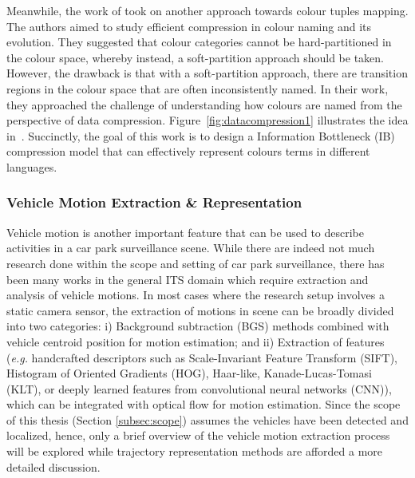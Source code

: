 Meanwhile, the work of \cite{zaslavsky2018efficient} took on another approach towards
colour tuples mapping. The authors aimed to study efficient compression in colour naming and its evolution. They suggested that colour categories cannot be hard-partitioned in the colour space, whereby instead, a soft-partition approach should be taken. However, the drawback is that with a soft-partition approach, there are transition regions in the colour space that are often inconsistently named. In their work, they approached the challenge of understanding how colours are named from the perspective of data compression. Figure~\ref{fig:datacompression1} illustrates the idea in~\cite{zaslavsky2018efficient}. Succinctly, the goal of this work is to design a Information Bottleneck (IB) compression model that can effectively represent colours terms in different languages.

\vspace{1em}
\subsubsection{Vehicle Motion Extraction \& Representation}
\label{subsec:vehiclemotionextraction}

Vehicle motion is another important feature that can be used to describe activities in a car park surveillance scene. While there are indeed not much research done within the scope and setting of car park surveillance, there has been many works in the general ITS domain which require extraction and analysis of vehicle motions. In most cases where the research setup involves a static camera sensor, the extraction of motions in scene can be broadly divided into two categories:
i) Background subtraction (BGS) methods combined with vehicle centroid position for motion estimation; and ii) Extraction of features (\emph{e.g.} handcrafted descriptors such as Scale-Invariant Feature Transform (SIFT), Histogram of Oriented Gradients (HOG), Haar-like, Kanade-Lucas-Tomasi (KLT), or deeply learned features from convolutional neural networks (CNN)), which can be integrated with optical flow for motion estimation. 
Since the scope of this thesis (Section \ref{subsec:scope}) assumes the vehicles have been detected and localized, hence, only a brief overview of the vehicle motion extraction process will be explored while trajectory representation methods are afforded a more detailed discussion.

